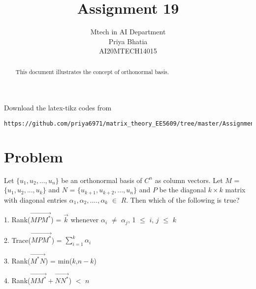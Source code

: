 \documentclass[journal,12pt]{IEEEtran}
\begin{document}
     \def\rightbox#1{\makebox[0in][r]{#1}}
     \def\centbox#1{\makebox[0in]{#1}}
     \def\topbox#1{\raisebox{-\baselineskip}[0in][0in]{#1}}
     \def\midbox#1{\raisebox{-0.5\baselineskip}[0in][0in]{#1}}
\vspace{3cm}
\title{Assignment 19}
\author{Mtech in AI Department\\Priya Bhatia\\AI20MTECH14015}
\maketitle
\bigskip
\renewcommand{\thefigure}{\theenumi}
\renewcommand{\thetable}{\theenumi}
\begin{abstract}
This document illustrates the concept of orthonormal basis.
\end{abstract}
%
Download the latex-tikz codes from 
%
\begin{lstlisting}
https://github.com/priya6971/matrix_theory_EE5609/tree/master/Assignment19
\end{lstlisting}
\section{\textbf{Problem}}
%
Let $\{u_1,u_2,...,u_n\}$ be an orthonormal basis of $C^n$ as column vectors. Let $M$ = $\{u_1,u_2,...,u_k\}$ and $N$ = $\{u_{k+1},u_{k+2},...,u_n\}$ and $P$ be the diagonal $k \times k$ matrix with diagonal entries $\alpha_1,\alpha_2,....,\alpha_k$ $\in$ $R$. Then which of the following is true?

1. Rank($\vec{MP{M}^*}$) = $\vec{k}$ whenever $\alpha_i$ $\ne$ $\alpha_j$, 1 $\leq$ $i$, $j$ $\leq$ $k$

2. Trace($\vec{MP{M}^*}$) = $\sum_{i=1}^{k}\alpha_i$

3. Rank($\vec{{M}^*N}$) = min($k$,$n-k$)

4. Rank($\vec{M{M}^*}+\vec{N{N}^*}$) $<$ $n$
%
\end{document}
